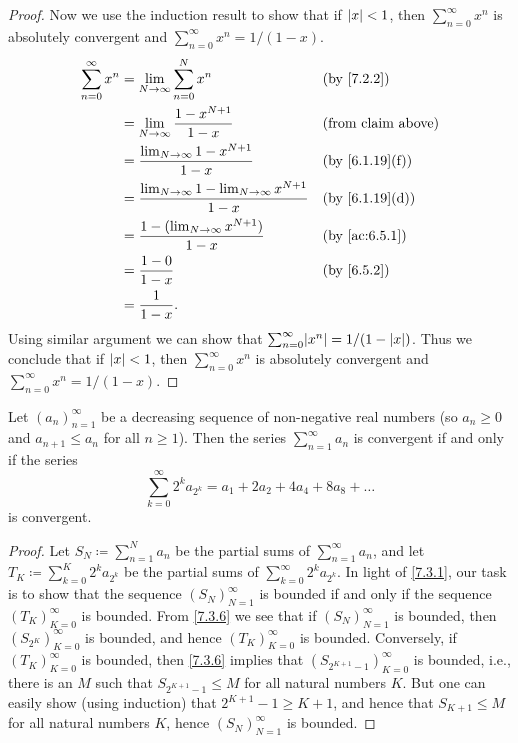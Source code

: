 \begin{proof}
  Now we use the induction result to show that if \(\left\lvert x\right\rvert < 1\), then \(\sum_{n = 0}^\infty x^n\) is absolutely convergent and \(\sum_{n = 0}^\infty x^n = 1 / (1 - x)\).
  \begin{align*}
    \sum_{n = 0}^\infty x^n & = \lim_{N \to \infty} \sum_{n = 0}^N x^n                               &  & \text{(by \cref{7.2.2})}     \\
                            & = \lim_{N \to \infty} \dfrac{1 - x^{N + 1}}{1 - x}                     &  & \text{(from claim above)}    \\
                            & = \dfrac{\lim_{N \to \infty} 1 - x^{N + 1}}{1 - x}                     &  & \text{(by \cref{6.1.19}(f))} \\
                            & = \dfrac{\lim_{N \to \infty} 1 - \lim_{N \to \infty} x^{N + 1}}{1 - x} &  & \text{(by \cref{6.1.19}(d))} \\
                            & = \dfrac{1 - (\lim_{N \to \infty} x^{N + 1})}{1 - x}                   &  & \text{(by \cref{ac:6.5.1})}  \\
                            & = \dfrac{1 - 0}{1 - x}                                                 &  & \text{(by \cref{6.5.2})}     \\
                            & = \dfrac{1}{1 - x}.
  \end{align*}
  Using similar argument we can show that \(\sum_{n = 0}^\infty \abs{x^n} = 1 / (1 - \abs{x})\).
  Thus we conclude that if \(\left\lvert x\right\rvert < 1\), then \(\sum_{n = 0}^\infty x^n\) is absolutely convergent and \(\sum_{n = 0}^\infty x^n = 1 / (1 - x)\).
\end{proof}

\begin{prop}\label{7.3.4}
  Let \((a_n)_{n = 1}^\infty\) be a decreasing sequence of non-negative real numbers
  (so \(a_n \geq 0\) and \(a_{n + 1} \leq a_n\) for all \(n \geq 1\)).
  Then the series \(\sum_{n = 1}^\infty a_n\) is convergent if and only if the series
  \[
    \sum_{k = 0}^\infty 2^k a_{2^k} = a_1 + 2a_2 + 4a_4 + 8a_8 + \dots
  \]
  is convergent.
\end{prop}

\begin{proof}
  Let \(S_N \coloneqq \sum_{n = 1}^N a_n\) be the partial sums of \(\sum_{n = 1}^\infty a_n\), and let \(T_K \coloneqq \sum_{k = 0}^K 2^k a_{2^k}\) be the partial sums of \(\sum_{k = 0}^\infty 2^k a_{2^k}\).
  In light of \cref{7.3.1}, our task is to show that the sequence \((S_N)_{N = 1}^\infty\) is bounded if and only if the sequence \((T_K)_{K = 0}^\infty\) is bounded.
  From \cref{7.3.6} we see that if \((S_N)_{N = 1}^\infty\) is bounded, then \((S_{2^K})_{K = 0}^\infty\) is bounded, and hence \((T_K)_{K = 0}^\infty\) is bounded.
  Conversely, if \((T_K)_{K = 0}^\infty\) is bounded, then \cref{7.3.6} implies that \((S_{2^{K + 1} - 1})_{K = 0}^\infty\) is bounded, i.e., there is an \(M\) such that \(S_{2^{K + 1} - 1} \leq M\) for all natural numbers \(K\).
  But one can easily show (using induction) that \(2^{K + 1} - 1 \geq K + 1\), and hence that \(S_{K + 1} \leq M\) for all natural numbers \(K\), hence \((S_N)_{N = 1}^\infty\) is bounded.
\end{proof}


